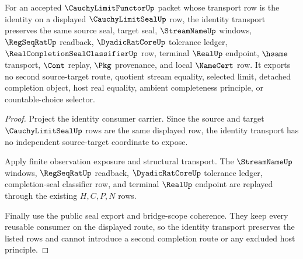 \begin{theorem}
\label{thm:cauchy-limit-functor-identity-transport}
For an accepted $\CauchyLimitFunctorUp$ packet whose transport row is the identity on a displayed $\CauchyLimitSealUp$ row, the identity transport preserves the same source seal, target seal, $\StreamNameUp$ windows, $\RegSeqRatUp$ readback, $\DyadicRatCoreUp$ tolerance ledger, $\RealCompletionSealClassifierUp$ row, terminal $\RealUp$ endpoint, $\hsame$ transport, $\Cont$ replay, $\Pkg$ provenance, and local $\NameCert$ row. It exports no second source-target route, quotient stream equality, selected limit, detached completion object, host real equality, ambient completeness principle, or countable-choice selector.
\end{theorem}
\begin{proof}
Project the identity consumer carrier. Since the source and target $\CauchyLimitSealUp$ rows are the same displayed row, the identity transport has no independent source-target coordinate to expose.

Apply finite observation exposure and structural transport. The $\StreamNameUp$ windows, $\RegSeqRatUp$ readback, $\DyadicRatCoreUp$ tolerance ledger, completion-seal classifier row, and terminal $\RealUp$ endpoint are replayed through the existing $H,C,P,N$ rows.

Finally use the public seal export and bridge-scope coherence. They keep every reusable consumer on the displayed route, so the identity transport preserves the listed rows and cannot introduce a second completion route or any excluded host principle.
\end{proof}

